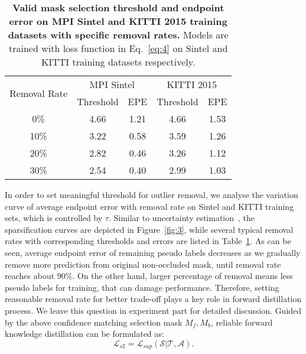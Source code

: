 \documentclass[lettersize,journal]{IEEEtran}
\begin{document}
\begin{table}[t]
	\renewcommand\arraystretch{1.1}
	\caption{\textbf{Valid mask selection threshold and endpoint error on MPI Sintel and KITTI 2015 training datasets with specific removal rates.} Models are trained with loss function in Eq.~\ref{eq:4} on Sintel and KITTI training datasets respectively.}
	\label{tab:1}
	\centering
	\renewcommand{\arraystretch}{1.1}
	\tabcolsep=3.6mm
	\begin{tabular}{c|cc|cc}
		\toprule
		\multirow{2}{*}{Removal Rate} & \multicolumn{2}{c|}{MPI Sintel} & \multicolumn{2}{c}{KITTI 2015} \\
		& \multicolumn{1}{c}{Threshold} & \multicolumn{1}{c|}{EPE} & \multicolumn{1}{c}{Threshold} & \multicolumn{1}{c}{EPE} \\
		\midrule
		\multicolumn{1}{c|}{0\%} & 4.66 & 1.21 & 4.66 & 1.53 \\
		\multicolumn{1}{c|}{10\%} & 3.22 & 0.58 & 3.59 & 1.26 \\
		\multicolumn{1}{c|}{20\%} & 2.82 & 0.46 & 3.26 & 1.12 \\
		\multicolumn{1}{c|}{30\%} & 2.54 & 0.40 & 2.99 & 1.03 \\
		\bottomrule
	\end{tabular}
\end{table}

In order to set meaningful threshold for outlier removal, we analyse the variation curve of average endpoint error with removal rate on Sintel and KITTI training sets, which is controlled by $\tau$. Similar to uncertainty estimation~\cite{10.1007/978-3-030-01234-2_40}, the sparsification curves are depicted in Figure~\ref{fig:3}, while several typical removal rates with corresponding thresholds and errors are listed in Table~\ref{tab:1}. As can be seen, average endpoint error of remaining pseudo labels decreases as we gradually remove more prediction from original non-occluded mask, until removal rate reaches about $90\%$. On the other hand, larger percentage of removal means less pseudo labels for training, that can damage performance. Therefore, setting reasonable removal rate for better trade-off plays a key role in forward distillation process. We leave this question in experiment part for detailed discussion. Guided by the above confidence matching selection mask $M_f, M_b$, reliable forward knowledge distillation can be formulated as:
\begin{equation}
	\mathcal{L}_{s2} = \mathcal{L}_{sup}(\mathcal{S} | \mathcal{T}, \mathcal{A}).
	\label{eq:6}
\end{equation}
\end{document}
